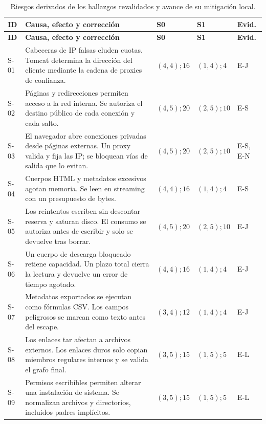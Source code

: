 \clearpage
\begingroup\footnotesize\setlength{\tabcolsep}{3pt}
\begin{longtable}{@{}p{}>{\raggedright\arraybackslash}p{}p{}p{}p{}@{}}
	\caption{Riesgos derivados de los hallazgos revalidados y avance de su mitigación local.}\label{tabla:riesgos-seguridad-s0-s1}\\
	\toprule
	\textbf{ID} & \textbf{Causa, efecto y corrección} & \textbf{S0} & \textbf{S1} & \textbf{Evid.}\\
	\midrule
	\endfirsthead
	\toprule
	\textbf{ID} & \textbf{Causa, efecto y corrección} & \textbf{S0} & \textbf{S1} & \textbf{Evid.}\\
	\midrule
	\endhead
	S-01 & Cabeceras de IP falsas eluden cuotas. Tomcat determina la dirección del cliente mediante la cadena de proxies de confianza. & $(4,4);16$ & $(1,4);4$ & E-J\\
	S-02 & Páginas y redirecciones permiten acceso a la red interna. Se autoriza el destino público de cada conexión y cada salto. & $(4,5);20$ & $(2,5);10$ & E-S\\
	S-03 & El navegador abre conexiones privadas desde páginas externas. Un proxy valida y fija las IP; se bloquean vías de salida que lo evitan. & $(4,5);20$ & $(2,5);10$ & E-S, E-N\\
	S-04 & Cuerpos HTML y metadatos excesivos agotan memoria. Se leen en streaming con un presupuesto de bytes. & $(4,4);16$ & $(1,4);4$ & E-S\\
	S-05 & Los reintentos escriben sin descontar reserva y saturan disco. El consumo se autoriza antes de escribir y solo se devuelve tras borrar. & $(4,5);20$ & $(2,5);10$ & E-J\\
	S-06 & Un cuerpo de descarga bloqueado retiene capacidad. Un plazo total cierra la lectura y devuelve un error de tiempo agotado. & $(4,4);16$ & $(1,4);4$ & E-J\\
	S-07 & Metadatos exportados se ejecutan como fórmulas CSV. Los campos peligrosos se marcan como texto antes del escape. & $(3,4);12$ & $(1,4);4$ & E-J\\
	S-08 & Los enlaces tar afectan a archivos externos. Los enlaces duros solo copian miembros regulares internos y se valida el grafo final. & $(3,5);15$ & $(1,5);5$ & E-L\\
	S-09 & Permisos escribibles permiten alterar una instalación de sistema. Se normalizan archivos y directorios, incluidos padres implícitos. & $(3,5);15$ & $(1,5);5$ & E-L\\

\end{longtable}
